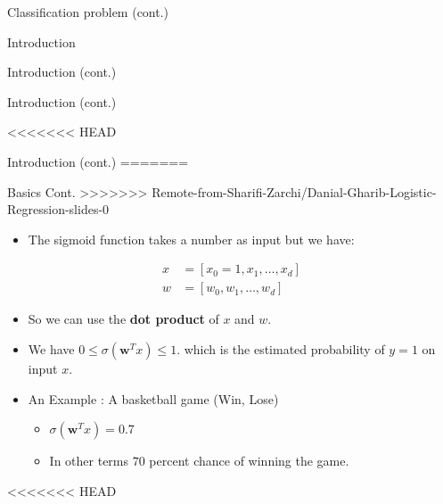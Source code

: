 \documentclass[serif, aspectratio=169]{beamer}
\begin{document}
\begin{frame}{Classification problem (cont.)}
\begin{itemize}
\begin{frame}{Introduction}
\begin{itemize}
\begin{frame}{Introduction (cont.)}
\begin{frame}{Introduction (cont.)}
    
<<<<<<< HEAD
\begin{frame}{Introduction (cont.)}
=======
\begin{frame}{Basics Cont.}
>>>>>>> Remote-from-Sharifi-Zarchi/Danial-Gharib-Logistic-Regression-slides-0
    \begin{itemize}
      \item The sigmoid function takes a number as input but we have:
    \end{itemize}
        \begin{align*}
            x &= [x_0=1,x_1, \dots, x_d] \\
            w &= [w_0, w_1, \dots, w_d]
        \end{align*}
    \begin{itemize} 
      \item So we can use the \textbf{dot product} of $x$ and $w$.
      
      \item We have $0\leq \sigma (\mathbf{w}^Tx) \leq 1$. which is the estimated probability of $y=1$ on input $x$.

      \item An Example : A basketball game (Win, Lose)
        \begin{itemize}
            \item $\sigma (\mathbf{w}^T x) = 0.7$
            \item In other terms $70$ percent chance of winning the game.
        \end{itemize}
        
    \end{itemize}
\end{frame}
<<<<<<< HEAD

\end{frame}
\end{frame}
\end{frame}
\end{itemize}
\end{frame}
\end{itemize}
\end{frame}
\end{document}
